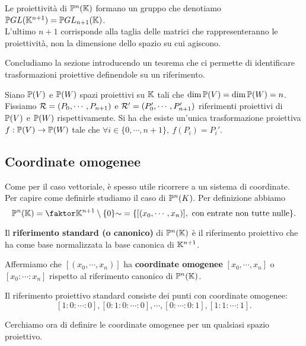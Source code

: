 \begin{multicols*}{2}
    \begin{notation}
    Le proiettivit\`a di $\mathbb{P}^n(\mathbb{K})$ formano un gruppo che denotiamo $\PGL{\K^{n+1}}=\Pj \GL[n+1]\K$.\\
    L'ultimo $n+1$ corrisponde alla taglia delle matrici che rappresenteranno le proiettivit\`a, non la dimensione dello spazio su cui agiscono.
    \end{notation}

    \noindent
    Concludiamo la sezione introducendo un teorema che ci permette di identificare trasformazioni proiettive definendole su un riferimento.
    \begin{theorem}\label{TeoremaFondamentaleTrasformazioniProiettive}
    Siano ${\mathbb{P}(V)}$ e ${\mathbb{P}(W)}$ spazi proiettivi su $\mathbb{K}$ tali che $\dim {\mathbb{P}(V)}=\dim {\mathbb{P}(W)}=n$. Fissiamo $\mathcal{R}=(P_0,\cdots,P_{n+1})$ e $\mathcal{R}'=(P_0',\cdots,P_{n+1}')$ riferimenti proiettivi di ${\mathbb{P}(V)}$ e ${\mathbb{P}(W)}$ rispettivamente. Si ha che esiste un'unica trasformazione proiettiva $f:{\mathbb{P}(V)}\to{\mathbb{P}(W)}$ tale che $\forall i\in\{0,\cdots,n+1\},\ f(P_i)=P_i'$.
    \end{theorem}



    \subsection{Coordinate omogenee}
    Come per il caso vettoriale, \`e spesso utile ricorrere a un sistema di coordinate. Per capire come definirle studiamo il caso di $\mathbb{P}^n(K)$. Per definizione abbiamo
    \[\Pj^n(\K)=\quot{\K^{n+1}\nz}{\sim}=\{[(x_0,\cdots,x_n)],\ \text{con entrate non tutte nulle}\}.\]
    \begin{definition}
    Il \textbf{riferimento standard (o canonico)} di $\mathbb{P}^n(\mathbb{K})$ \`e il riferimento proiettivo che ha come base normalizzata la base canonica di $\mathbb{K}^{n+1}$.\medskip

    \noindent
    Affermiamo che $[(x_0,\cdots,x_n)]$ ha \textbf{coordinate omogenee} $[x_0,\cdots,x_n]$ o $[x_0:\cdots:x_n]$ rispetto al riferimento canonico di $\mathbb{P}^n(\mathbb{K})$.
    \end{definition}
    \begin{remark}
    Il riferimento proiettivo standard consiste dei punti con coordinate omogenee:
    \[[1:0:\cdots:0],[0:1:0:\cdots:0],\cdots,[0:\cdots:0:1],[1:1:\cdots:1].\]
    \end{remark}

    \noindent
    Cerchiamo ora di definire le coordinate omogenee per un qualsiasi spazio proiettivo.


\end{multicols*}
